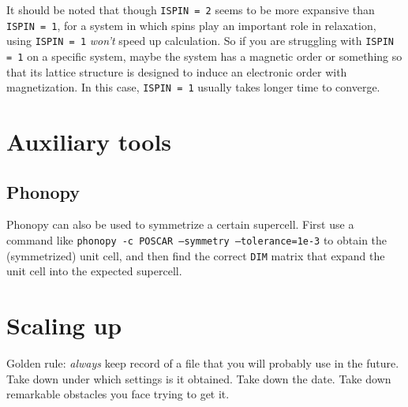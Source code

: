 \documentclass[hyperref, a4paper]{article}
\begin{document}
It should be noted that though \texttt{ISPIN = 2} seems to be more expansive than \texttt{ISPIN = 1}, for a system in which spins play an important role in relaxation, using \texttt{ISPIN = 1} \emph{won't} speed up calculation.
So if you are struggling with \texttt{ISPIN = 1} on a specific system, maybe the system has a magnetic order or something so that its lattice structure is designed to induce an electronic order with magnetization.
In this case, \texttt{ISPIN = 1} usually takes longer time to converge.

\section{Auxiliary tools}

\subsection{Phonopy}

Phonopy can also be used to symmetrize a certain supercell.
First use a command like \texttt{phonopy -c POSCAR --symmetry --tolerance=1e-3} to obtain the (symmetrized) unit cell, and then find the correct \texttt{DIM} matrix that expand the unit cell into the expected supercell.

\section{Scaling up}

Golden rule: \emph{always} keep record of a file that you will probably use in the future. 
Take down under which settings is it obtained. Take down the date. Take down remarkable obstacles you face trying to get it.


 
\end{document}
